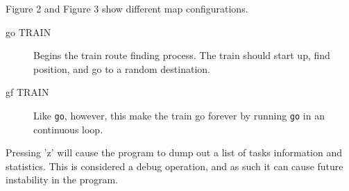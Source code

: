 \documentclass[letterpaper]{article}
\begin{document}
Figure 2 and Figure 3 show different map configurations.
\begin{figure}
\noindent{}
\end{figure}
\begin{figure}
\noindent{}
\end{figure}
%
\begin{description}
\item[{go TRAIN}] \leavevmode 
Begins the train route finding process. The train should start up, find position, and go to a random destination.

\item[{gf TRAIN}] \leavevmode 
Like \texttt{go}, however, this make the train go forever by running \texttt{go} in an continuous loop.

\end{description}

Pressing 'z' will cause the program to dump out a list of tasks information and statistics.   This is considered a debug operation, and as such it can cause future instability in the program.
\end{document}
